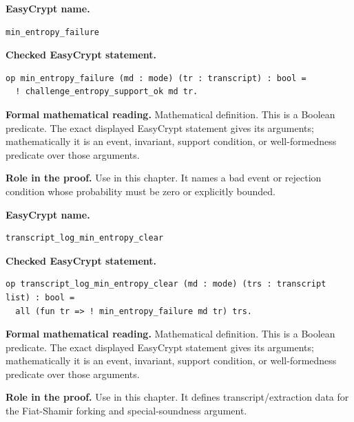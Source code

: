 \begin{formaldefinition}
\noindent\textbf{EasyCrypt name.}
\begin{lstlisting}[language=EasyCrypt,basicstyle=\ttfamily\scriptsize]
min_entropy_failure
\end{lstlisting}
\noindent\textbf{Checked EasyCrypt statement.}
\begin{lstlisting}[language=EasyCrypt,basicstyle=\ttfamily\scriptsize]
op min_entropy_failure (md : mode) (tr : transcript) : bool =
  ! challenge_entropy_support_ok md tr.
\end{lstlisting}
\noindent\textbf{Formal mathematical reading.}
Mathematical definition. This is a Boolean predicate.  The exact displayed EasyCrypt statement gives its arguments; mathematically it is an event, invariant, support condition, or well-formedness predicate over those arguments.

\noindent\textbf{Role in the proof.}
Use in this chapter. It names a bad event or rejection condition whose probability must be zero or explicitly bounded.

\end{formaldefinition}

\begin{formaldefinition}
\noindent\textbf{EasyCrypt name.}
\begin{lstlisting}[language=EasyCrypt,basicstyle=\ttfamily\scriptsize]
transcript_log_min_entropy_clear
\end{lstlisting}
\noindent\textbf{Checked EasyCrypt statement.}
\begin{lstlisting}[language=EasyCrypt,basicstyle=\ttfamily\scriptsize]
op transcript_log_min_entropy_clear (md : mode) (trs : transcript list) : bool =
  all (fun tr => ! min_entropy_failure md tr) trs.
\end{lstlisting}
\noindent\textbf{Formal mathematical reading.}
Mathematical definition. This is a Boolean predicate.  The exact displayed EasyCrypt statement gives its arguments; mathematically it is an event, invariant, support condition, or well-formedness predicate over those arguments.

\noindent\textbf{Role in the proof.}
Use in this chapter. It defines transcript/extraction data for the Fiat-Shamir forking and special-soundness argument.

\end{formaldefinition}

